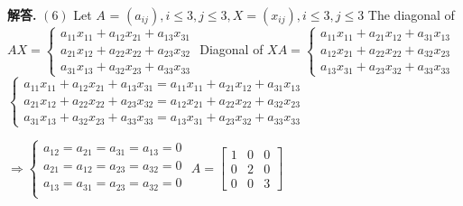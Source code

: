 \documentclass[10pt, a4paper, oneside]{article}
\newenvironment{solution}{\par\noindent\textbf{解答. }}{\par}
\begin{document}
\begin{CJK}{UTF8}{gbsn}
\begin{solution}
  $(6)$ Let $A$ = $(a_{ij}), i\leq 3, j \leq 3, X = (x_{ij}), i \leq 3, j \leq 3$\newline 
  The diagonal of $AX = \begin{cases}
    a_{11}x_{11} + a_{12}x_{21} + a_{13}x_{31} \\
    a_{21}x_{12} + a_{22}x_{22} + a_{23}x_{32} \\
    a_{31}x_{13} + a_{32}x_{23} + a_{33}x_{33}
   \end{cases}$ \newline
  Diagonal of $XA = \begin{cases}
    a_{11}x_{11} + a_{21}x_{12} + a_{31}x_{13} \\
    a_{12}x_{21} + a_{22}x_{22} + a_{32}x_{23} \\
    a_{13}x_{31} + a_{23}x_{32} + a_{33}x_{33} \end{cases}
  $ \newline
  $\begin{cases}
    a_{11}x_{11} + a_{12}x_{21} + a_{13}x_{31} =  a_{11}x_{11} + a_{21}x_{12} + a_{31}x_{13} \\
    a_{21}x_{12} + a_{22}x_{22} + a_{23}x_{32} =  a_{12}x_{21} + a_{22}x_{22} + a_{32}x_{23} \\
    a_{31}x_{13} + a_{32}x_{23} + a_{33}x_{33} =  a_{13}x_{31} + a_{23}x_{32} + a_{33}x_{33} 
  \end{cases}$ \newline

  $\Rightarrow \begin{cases}
    a_{12} = a_{21} = a_{31} = a_{13} = 0 \\
    a_{21} = a_{12} = a_{23} = a_{32} = 0 \\
    a_{13} = a_{31} = a_{23} = a_{32} = 0 \\
  \end{cases}$ \newline
  $A = \begin{bmatrix}
    1 & 0 & 0 \\ 0 & 2 & 0 \\ 0 & 0 & 3
  \end{bmatrix}$




\end{solution}

\end{CJK}
\end{document}

